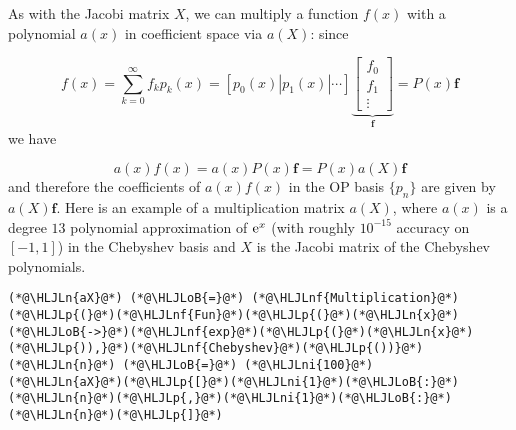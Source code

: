 \documentclass[12pt,a4paper]{article}
\newcommand{\HLJLn}[1]{#1}
\newcommand{\HLJLnf}[1]{\textcolor[RGB]{66,102,213}{#1}}
\newcommand{\HLJLni}[1]{\textcolor[RGB]{59,151,46}{#1}}
\newcommand{\HLJLoB}[1]{\textcolor[RGB]{102,102,102}{\textbf{#1}}}
\newcommand{\HLJLp}[1]{#1}
\begin{document}
As with the Jacobi matrix $X$, we can multiply a function $f(x)$ with a polynomial $a(x)$ in coefficient space via $a(X)$: since 

\[
f(x) = \sum_{k = 0}^{\infty} f_k p_k(x) = [p_0(x) | p_1(x) | \ensuremath{\cdots}]\underbrace{\begin{bmatrix}
f_0 \\
f_1 \\
\vdots
\end{bmatrix}}_{\mathbf{f}} = P(x)\mathbf{f}
\]
we have

\[
a(x)f(x) = a(x)P(x)\mathbf{f} = P(x)a(X)\mathbf{f}
\]
and therefore the coefficients of $a(x)f(x)$ in the OP basis $\{ p_n\}$ are given by $a(X)\mathbf{f}$.  Here is an example of a multiplication matrix $a(X)$, where $a(x)$ is a degree $13$ polynomial approximation of ${\rm e}^{x}$ (with roughly $10^{-15}$ accuracy on $[-1, 1]$) in the Chebyshev basis and $X$ is the Jacobi matrix of the Chebyshev polynomials.


\begin{lstlisting}
(*@\HLJLn{aX}@*) (*@\HLJLoB{=}@*) (*@\HLJLnf{Multiplication}@*)(*@\HLJLp{(}@*)(*@\HLJLnf{Fun}@*)(*@\HLJLp{(}@*)(*@\HLJLn{x}@*)(*@\HLJLoB{->}@*)(*@\HLJLnf{exp}@*)(*@\HLJLp{(}@*)(*@\HLJLn{x}@*)(*@\HLJLp{)),}@*)(*@\HLJLnf{Chebyshev}@*)(*@\HLJLp{())}@*)
(*@\HLJLn{n}@*) (*@\HLJLoB{=}@*) (*@\HLJLni{100}@*)
(*@\HLJLn{aX}@*)(*@\HLJLp{[}@*)(*@\HLJLni{1}@*)(*@\HLJLoB{:}@*)(*@\HLJLn{n}@*)(*@\HLJLp{,}@*)(*@\HLJLni{1}@*)(*@\HLJLoB{:}@*)(*@\HLJLn{n}@*)(*@\HLJLp{]}@*)
\end{lstlisting}
\end{document}
